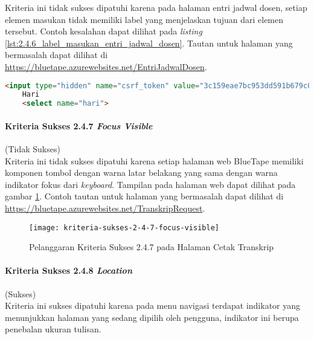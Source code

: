 Kriteria ini tidak sukses dipatuhi karena pada halaman entri jadwal dosen, setiap elemen masukan tidak memiliki label yang menjelaskan tujuan dari elemen tersebut. Contoh kesalahan dapat dilihat pada \textit{listing} \ref{lst:2.4.6_label_masukan_entri_jadwal_dosen}. Tautan untuk halaman yang bermasalah dapat dilihat di \url{https://bluetape.azurewebsites.net/EntriJadwalDosen}.

\begin{lstlisting}[frame=single, label={lst:2.4.6_label_masukan_entri_jadwal_dosen}, language=HTML, caption=Pelanggaran Kriteria Sukses 2.4.6 pada Halaman Entri Jadwal Dosen]
    <input type="hidden" name="csrf_token" value="3c159eae7bc953dd591b679c080ed066"/>
    Hari
    <select name="hari">
\end{lstlisting}

\paragraph{Kriteria Sukses 2.4.7 \textit{Focus Visible}}
\label{par:kepatuhan_bluetape_kriteria_sukses_2.4.7}
(Tidak Sukses)\\

Kriteria ini tidak sukses dipatuhi karena setiap halaman web BlueTape memiliki komponen tombol dengan warna latar belakang yang sama dengan warna indikator fokus dari \textit{keyboard}. Tampilan pada halaman web dapat dilihat pada gambar \ref{fig:2.4.7_focus_visible}. Contoh tautan untuk halaman yang bermasalah dapat dilihat di \url{https://bluetape.azurewebsites.net/TranskripRequest}. 

\begin{figure}[H]
    \centering  
    \texttt{[image: kriteria-sukses-2-4-7-focus-visible]}  
    \caption[Pelanggaran Kriteria Sukses 2.4.7 pada Halaman Cetak Transkrip]{Pelanggaran Kriteria Sukses 2.4.7 pada Halaman Cetak Transkrip}
    \label{fig:2.4.7_focus_visible}  
\end{figure}

\paragraph{Kriteria Sukses 2.4.8 \textit{Location}}
\label{par:kepatuhan_bluetape_kriteria_sukses_2.4.8}
(Sukses)\\

Kriteria ini sukses dipatuhi karena pada menu navigasi terdapat indikator yang menunjukkan halaman yang sedang dipilih oleh pengguna, indikator ini berupa penebalan ukuran tulisan.

